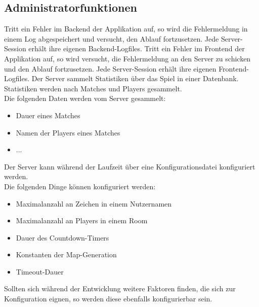 \subsection{Administratorfunktionen}
\begin{description}
		Tritt ein Fehler im Backend der Applikation auf, so wird die Fehlermeldung in einem Log abgespeichert und versucht, den Ablauf fortzusetzen. Jede Server-Session erhält ihre eigenen Backend-Logfiles.
		Tritt ein Fehler im Frontend der Applikation auf, so wird versucht, die Fehlermeldung an den Server zu schicken und den Ablauf fortzusetzen. Jede Server-Session erhält ihre eigenen Frontend-Logfiles.
		Der Server sammelt Statistiken über das Spiel in einer Datenbank. Statistiken werden nach Matches und Players gesammelt. \\
		Die folgenden Daten werden vom Server gesammelt:
		\begin{itemize}
			\item Dauer eines Matches
			\item Namen der Players eines Matches
			\item ...
		\end{itemize}
		Der Server kann während der Laufzeit über eine Konfigurationsdatei konfiguriert werden. \\
		Die folgenden Dinge können konfiguriert werden:
		\begin{itemize}
			\item Maximalanzahl an Zeichen in einem Nutzernamen
			\item Maximalanzahl an Players in einem Room
			\item Dauer des Countdown-Timers
			\item Konstanten der Map-Generation
			\item Timeout-Dauer
		\end{itemize}
		Sollten sich während der Entwicklung weitere Faktoren finden, die sich zur Konfiguration eignen, so werden diese ebenfalls konfigurierbar sein.
\end{description}